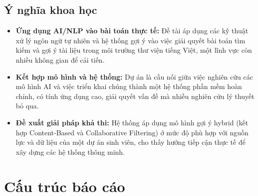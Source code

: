 \subsection{Ý nghĩa khoa học}
\label{subsec:YNghiaKhoaHoc}
\begin{itemize}
    \item \textbf{Ứng dụng AI/NLP vào bài toán thực tế:} Đề tài áp dụng các kỹ thuật xử lý ngôn ngữ tự nhiên và hệ thống gợi ý vào việc giải quyết bài toán tìm kiếm và gợi ý tài liệu trong môi trường thư viện tiếng Việt, một lĩnh vực còn nhiều không gian để cải tiến.
    \item \textbf{Kết hợp mô hình và hệ thống:} Dự án là cầu nối giữa việc nghiên cứu các mô hình AI và việc triển khai chúng thành một hệ thống phần mềm hoàn chỉnh, có tính ứng dụng cao, giải quyết vấn đề mà nhiều nghiên cứu lý thuyết bỏ qua.
    \item \textbf{Đề xuất giải pháp khả thi:} Hệ thống áp dụng mô hình gợi ý hybrid (kết hợp Content-Based và Collaborative Filtering) ở mức độ phù hợp với nguồn lực và dữ liệu của một dự án sinh viên, cho thấy hướng tiếp cận thực tế để xây dựng các hệ thống thông minh.
\end{itemize}

\section{Cấu trúc báo cáo}
\label{sec:CauTruc}

